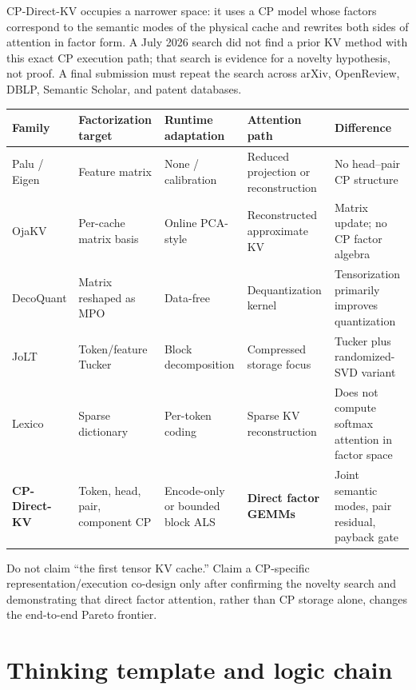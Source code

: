 \documentclass[11pt]{article}
\begin{document}
CP-Direct-KV occupies a narrower space: it uses a CP model whose factors correspond to the semantic
modes of the physical cache and rewrites both sides of attention in factor form. A July 2026 search
did not find a prior KV method with this exact CP execution path; that search is evidence for a
novelty hypothesis, not proof. A final submission must repeat the search across arXiv, OpenReview,
DBLP, Semantic Scholar, and patent databases.

\begin{center}
\scriptsize
\renewcommand{\arraystretch}{1.22}
\begin{tabularx}{\textwidth}{@{}p{2.0cm}p{2.25cm}p{2.25cm}p{2.25cm}X@{}}
\toprule
\textbf{Family} & \textbf{Factorization target} & \textbf{Runtime adaptation} & \textbf{Attention path} & \textbf{Difference} \\
\midrule
Palu / Eigen & Feature matrix & None / calibration & Reduced projection or reconstruction & No head--pair CP structure \\
OjaKV & Per-cache matrix basis & Online PCA-style & Reconstructed approximate KV & Matrix update; no CP factor algebra \\
DecoQuant & Matrix reshaped as MPO & Data-free & Dequantization kernel & Tensorization primarily improves quantization \\
JoLT & Token/feature Tucker & Block decomposition & Compressed storage focus & Tucker plus randomized-SVD variant \\
Lexico & Sparse dictionary & Per-token coding & Sparse KV reconstruction & Does not compute softmax attention in factor space \\
\textbf{CP-Direct-KV} & Token, head, pair, component CP & Encode-only or bounded block ALS & \textbf{Direct factor GEMMs} & Joint semantic modes, pair residual, payback gate \\
\bottomrule
\end{tabularx}
\end{center}

\begin{claimbox}
Do not claim ``the first tensor KV cache.'' Claim a CP-specific representation/execution co-design
only after confirming the novelty search and demonstrating that direct factor attention, rather
than CP storage alone, changes the end-to-end Pareto frontier.
\end{claimbox}

\section{Thinking template and logic chain}
\end{document}
